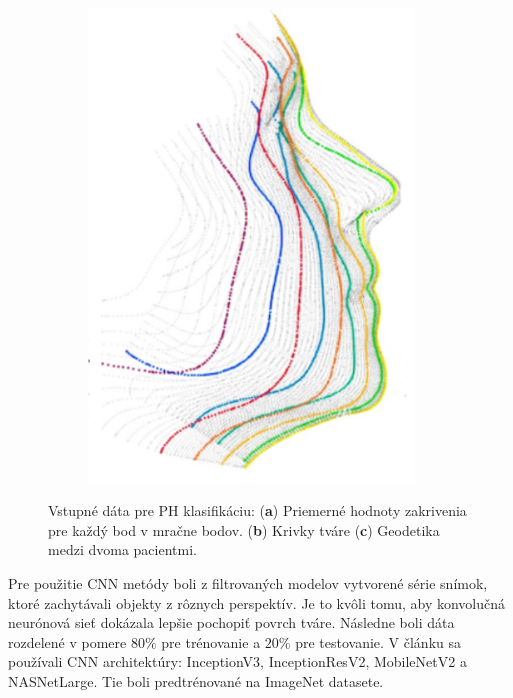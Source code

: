 \begin{figure}[h]
\begin{subfigure}[b]{0.32\textwidth}
		\includegraphics[width=0.95\textwidth]{figures/resers_c.png}
		\caption{}
		\label{fig:resers:c}
	\end{subfigure}
	\caption{Vstupné dáta pre PH klasifikáciu: (\textbf{a}) Priemerné hodnoty zakrivenia pre každý bod v mračne bodov. 
	(\textbf{b}) Krivky tváre
	(\textbf{c}) Geodetika medzi dvoma pacientmi. }
	\label{fig:resers}
\end{figure}

\newpage


Pre použitie CNN metódy boli z filtrovaných modelov vytvorené série snímok, ktoré zachytávali objekty z rôznych perspektív. Je to kvôli tomu, aby konvolučná neurónová sieť dokázala lepšie pochopiť povrch tváre. Následne boli dáta rozdelené v pomere $80\%$ pre trénovanie a $20\%$ pre testovanie. V článku sa používali CNN architektúry: InceptionV3, InceptionResV2, MobileNetV2 a NASNetLarge. Tie boli predtrénované na ImageNet datasete. 


